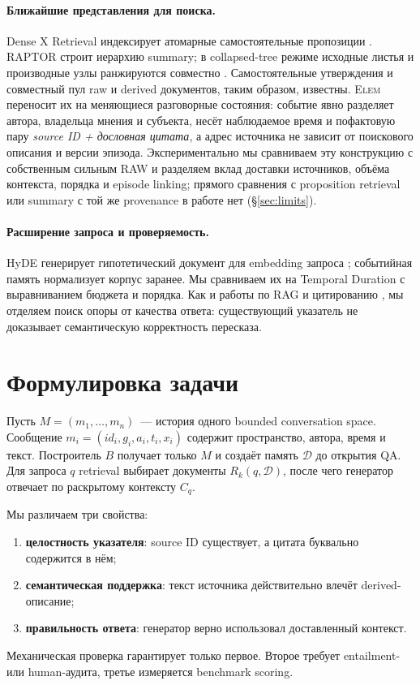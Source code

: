 \documentclass[11pt,a4paper]{article}
\newcommand{\method}{\textsc{Elem}}
\begin{document}
\paragraph{Ближайшие представления для поиска.}
Dense X Retrieval индексирует атомарные самостоятельные пропозиции
\citep{chen2023densex}. RAPTOR строит иерархию summary; в collapsed-tree
режиме исходные листья и производные узлы ранжируются совместно
\citep{sarthi2024raptor}. Самостоятельные утверждения и совместный пул raw и
derived документов, таким образом, известны. \method{} переносит их на
меняющиеся разговорные состояния: событие явно разделяет автора, владельца
мнения и субъекта, несёт наблюдаемое время и пофактовую пару \emph{source ID +
дословная цитата}, а адрес источника не зависит от поискового описания и версии
эпизода. Экспериментально мы сравниваем эту конструкцию с собственным сильным
RAW и разделяем вклад доставки источников, объёма контекста, порядка и episode
linking; прямого сравнения с proposition retrieval или summary с той же
provenance в работе нет (§\ref{sec:limits}).

\paragraph{Расширение запроса и проверяемость.}
HyDE генерирует гипотетический документ для embedding запроса
\citep{gao2023hyde}; событийная память нормализует корпус заранее.
Мы сравниваем их на Temporal Duration с выравниванием бюджета и порядка.
Как и работы по RAG и цитированию \citep{lewis2020,gao2023}, мы отделяем
поиск опоры от качества ответа: существующий указатель не доказывает
семантическую корректность пересказа.

\section{Формулировка задачи}
\label{sec:problem}

Пусть $M=(m_1,\ldots,m_n)$~--- история одного bounded conversation space.
Сообщение $m_i=(id_i,g_i,a_i,t_i,x_i)$ содержит пространство, автора, время и
текст. Построитель $B$ получает только $M$ и создаёт память $\mathcal{D}$ до
открытия QA. Для запроса $q$ retrieval выбирает документы $R_k(q,\mathcal{D})$,
после чего генератор отвечает по раскрытому контексту $C_q$.

Мы различаем три свойства:
\begin{enumerate}
\item \textbf{целостность указателя}: source ID существует, а цитата буквально
содержится в нём;
\item \textbf{семантическая поддержка}: текст источника действительно влечёт
derived-описание;
\item \textbf{правильность ответа}: генератор верно использовал доставленный
контекст.
\end{enumerate}
Механическая проверка гарантирует только первое. Второе требует entailment- или
human-аудита, третье измеряется benchmark scoring.
\end{document}
